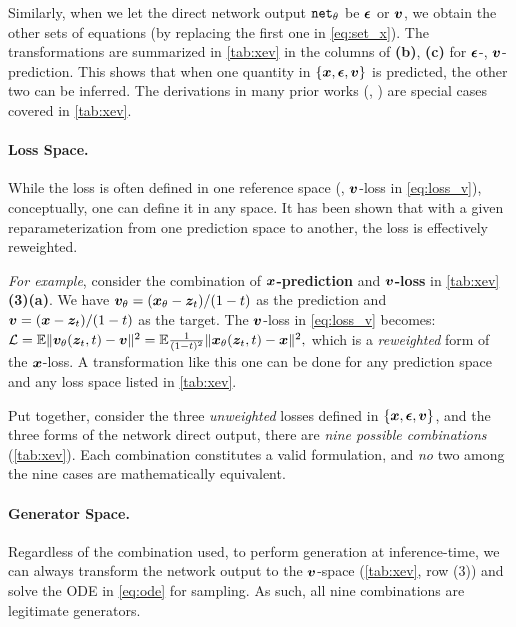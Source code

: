 Similarly, when we let the direct network output $\text{\texttt{net}}_\theta$
be $\bm{\epsilon}$ or $\bm{v}$, we obtain the other sets of equations
(by replacing the first one in \cref{eq:set_x}). The transformations are summarized in \cref{tab:xev} in the columns of \textbf{(b)}, \textbf{(c)} for $\bm{\epsilon}$-, $\bm{v}$-prediction.
This shows that when one quantity in $\{\bm{x}, \bm{\epsilon}, \bm{v} \}$ is predicted, the other two can be inferred. The derivations in many prior works (\eg, \cite{salimans2022progressive,esser2024scaling}) are special cases covered in \cref{tab:xev}.

\paragraph{Loss Space.}
While the loss is often defined in one reference space (\eg, $\bm{v}$-loss in \cref{eq:loss_v}), 
conceptually, one can define it in any space. 
It has been shown \cite{salimans2022progressive,esser2024scaling} that with a given reparameterization from one prediction space to another, the loss is effectively reweighted.

\textit{For example}, consider the combination of $\bm{x}$\textbf{-prediction} and $\bm{v}$\textbf{-loss} in \cref{tab:xev}\textbf{(3)(a)}. We have
$\bm{v}_\theta = (\bm{x}_\theta - \bm{z}_t)/(1 - t)$
as the prediction and
$\bm{v} = (\bm{x} - \bm{z}_t) / (1-t)$
as the target. The $\bm{v}$-loss in \cref{eq:loss_v} becomes: 
$
\mathcal{L} = \mathbb{E} \|  \bm{v}_\theta(\bm{z}_t, t) - \bm{v} \|^2 = \mathbb{E} \frac{1}{(1-t)^2} \| \bm{x}_\theta(\bm{z}_t, t) - \bm{x} \|^2,
$
which is a \textit{reweighted} form of the $\bm{x}$-loss. A transformation like this one can be done for any prediction space and any loss space listed in \cref{tab:xev}. 

Put together, consider the three \textit{unweighted} losses defined in $\{\bm{x}, \bm{\epsilon}, \bm{v} \}$, and the three forms of the network direct output, there are \textit{nine possible combinations} (\cref{tab:xev}).
Each combination constitutes a valid formulation, and \textit{no} two among the nine cases are mathematically equivalent.

\paragraph{Generator Space.}
Regardless of the combination used, to perform generation at inference-time,
we can always transform the network output to the $\bm{v}$-space (\cref{tab:xev}, row (3)) and solve the ODE in \cref{eq:ode} for sampling. As such, all nine combinations are legitimate generators.

